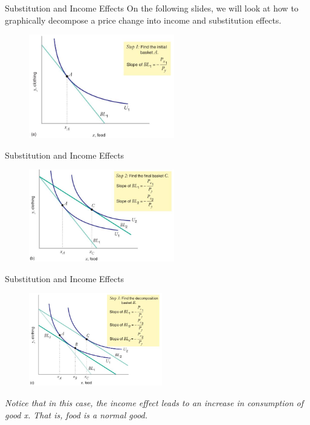 \documentclass[12pt,t]{beamer}
\begin{document}
\begin{frame}{Substitution and Income Effects}
  On the following slides, we will look at how to graphically decompose a price change into income and substitution effects.
  \begin{figure}
    \includegraphics[width=240px]{figures/fig5_6a.jpg}
  \end{figure}
\end{frame}

\begin{frame}{Substitution and Income Effects}
  \begin{figure}
    \includegraphics[width=240px]{figures/fig5_6b.jpg}
  \end{figure}
\end{frame}

\begin{frame}{Substitution and Income Effects}
  \begin{figure}
    \includegraphics[width=220px]{figures/fig5_6c.jpg}
  \end{figure}

  \emph{Notice that in this case, the income effect leads to an increase in consumption of good x. That is, food is a normal good.}
\end{frame}
\end{document}
